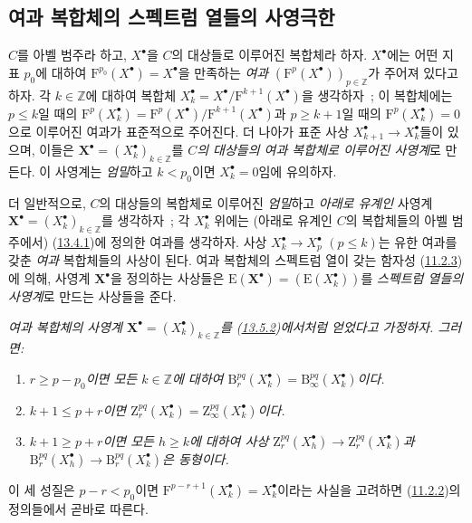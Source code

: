 \subsection{여과 복합체의 스펙트럼 열들의 사영극한}
\label{subsection:0.13.5-fr}
\begin{env}[13.5.1]
\label{0.13.5.1-fr}
$C$를 아벨 범주라 하고, $X^\bullet$을 $C$의 대상들로 이루어진
복합체라 하자. $X^\bullet$에는 어떤 지표 $p_0$에 대하여
$\mathrm F^{p_0}(X^\bullet)=X^\bullet$을 만족하는 \emph{여과}
$(\mathrm F^p(X^\bullet))_{p\in\mathbb Z}$가 주어져 있다고 하자.
각 $k\in\mathbb Z$에 대하여 복합체
$X_k^\bullet=X^\bullet/\mathrm F^{k+1}(X^\bullet)$을 생각하자~; 이
복합체에는 $p\leq k$일 때의
$\mathrm F^p(X_k^\bullet)=
\mathrm F^p(X^\bullet)/\mathrm F^{k+1}(X^\bullet)$과 $p\geq k+1$일 때의
$\mathrm F^p(X_k^\bullet)=0$으로 이루어진 여과가 표준적으로 주어진다.
더 나아가 표준 사상 $X_{k+1}^\bullet\to X_k^\bullet$들이 있으며,
이들은 $\mathbf X^\bullet=(X_k^\bullet)_{k\in\mathbb Z}$를
\emph{$C$의 대상들의 여과 복합체로 이루어진 사영계}로 만든다. 이
사영계는 \emph{엄밀}하고 $k<p_0$이면 $X_k^\bullet=0$임에 유의하자.
\end{env}
\begin{env}[13.5.2]
\label{0.13.5.2-fr}
더 일반적으로, $C$의 대상들의 복합체로 이루어진 \emph{엄밀}하고
\emph{아래로 유계인} 사영계
$\mathbf X^\bullet=(X_k^\bullet)_{k\in\mathbb Z}$를 생각하자~; 각
$X_k^\bullet$ 위에는 (아래로 유계인 $C$의 복합체들의 아벨 범주에서)
(\hyperref[0.13.4.1-fr]{13.4.1})에 정의한 여과를 생각하자. 사상
$X_k^\bullet\to X_p^\bullet$ $(p\leq k)$는 유한 여과를 갖춘
\emph{여과} 복합체들의 사상이 된다. 여과 복합체의 스펙트럼 열이
갖는 함자성 (\hyperref[0.11.2.3-fr]{11.2.3})에 의해, 사영계
$\mathbf X^\bullet$을 정의하는 사상들은
$\mathrm E(\mathbf X^\bullet)=(\mathrm E(X_k^\bullet))$를
\emph{스펙트럼 열들의 사영계}로 만드는 사상들을 준다.
\end{env}
\begin{lemma}[13.5.3]
\label{0.13.5.3-fr}
\emph{여과 복합체의 사영계
$\mathbf X^\bullet=(X_k^\bullet)_{k\in\mathbb Z}$를
(\hyperref[0.13.5.2-fr]{13.5.2})에서처럼 얻었다고 가정하자. 그러면:}
\begin{enumerate}
\item[\emph{a)}]\emph{$r\geq p-p_0$이면 모든 $k\in\mathbb Z$에 대하여
$\mathrm B_r^{pq}(X_k^\bullet)=\mathrm B_\infty^{pq}(X_k^\bullet)$이다.}
\item[\emph{b)}]\emph{$k+1\leq p+r$이면
$\mathrm Z_r^{pq}(X_k^\bullet)=\mathrm Z_\infty^{pq}(X_k^\bullet)$이다.}
\item[\emph{c)}]\emph{$k+1\geq p+r$이면 모든 $h\geq k$에 대하여 사상
$\mathrm Z_r^{pq}(X_h^\bullet)\to\mathrm Z_r^{pq}(X_k^\bullet)$과
$\mathrm B_r^{pq}(X_h^\bullet)\to\mathrm B_r^{pq}(X_k^\bullet)$은
동형이다.}
\end{enumerate}
\end{lemma}
이 세 성질은 $p-r<p_0$이면
$\mathrm F^{p-r+1}(X_k^\bullet)=X_k^\bullet$이라는 사실을 고려하면
(\hyperref[0.11.2.2-fr]{11.2.2})의 정의들에서 곧바로 따른다.

